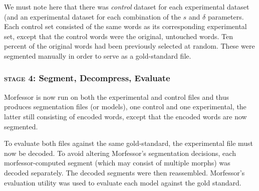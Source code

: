 We must note here that there was \emph{control} dataset for each experimental dataset (and an experimental dataset for each combination of the $s$ and $\delta$ parameters. Each control set consisted of the same words as its corresponding experimental set, except that the control words were the original, untouched words. Ten percent of the original words had been previously selected at random. These were segmented manually in order to serve as a gold-standard file. 

 
\subsubsection{\textsc{stage 4:} Segment, Decompress, Evaluate}
 Morfessor is now run on both the experimental and control files and thus produces segmentation files (or models), one control and one experimental, the latter still consisting of encoded words, except that the encoded words are now segmented.
 
 
 

To evaluate both files against the same gold-standard, the experimental file must now be decoded. To avoid altering  Morfessor’s segmentation decisions, each morfessor-computed segment (which may consist of multiple morphs) was decoded separately. The decoded segments were then reassembled. Morfessor's evaluation utility was used to evaluate each model against the gold standard. 

